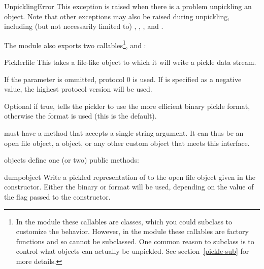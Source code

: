 \begin{excdesc}{UnpicklingError}
This exception is raised when there is a problem unpickling an object.
Note that other exceptions may also be raised during unpickling,
including (but not necessarily limited to) ,
, , and .
\end{excdesc}

The  module also exports two callables\footnote{In the
 module these callables are classes, which you could
subclass to customize the behavior.  However, in the 
module these callables are factory functions and so cannot be
subclassed.  One common reason to subclass is to control what
objects can actually be unpickled.  See section~\ref{pickle-sub} for
more details.},  and :

\begin{classdesc}{Pickler}{file}
This takes a file-like object to which it will write a pickle data
stream.  

If the  parameter is ommitted, protocol 0 is used.
If  is specified as a negative value,
the highest protocol version will be used.


Optional  if true, tells the pickler to use the more
efficient binary pickle format, otherwise the \ASCII{} format is used
(this is the default).

 must have a  method that accepts a single
string argument.  It can thus be an open file object, a
 object, or any other custom
object that meets this interface.
\end{classdesc}

 objects define one (or two) public methods:

\begin{methoddesc}[Pickler]{dump}{object}
Write a pickled representation of  to the open file object
given in the constructor.  Either the binary or \ASCII{} format will
be used, depending on the value of the  flag passed to the
constructor.
\end{methoddesc}


